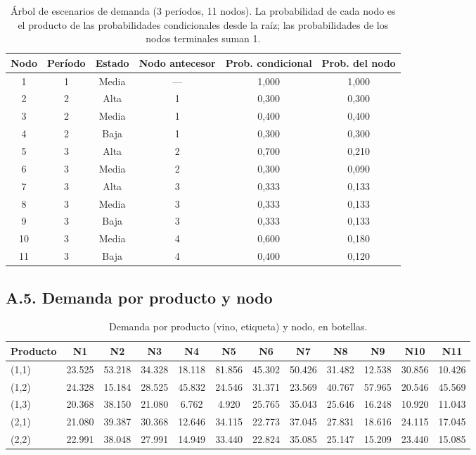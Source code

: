 \begin{table}[h]
  \centering
  \begin{tabular}{cccccc}
    \toprule
    \textbf{Nodo} & \textbf{Período} & \textbf{Estado} & \textbf{Nodo antecesor} & \textbf{Prob. condicional} & \textbf{Prob. del nodo} \\
    \midrule
    1  & 1 & Media & --- & 1,000 & 1,000 \\
    2  & 2 & Alta  & 1   & 0,300 & 0,300 \\
    3  & 2 & Media & 1   & 0,400 & 0,400 \\
    4  & 2 & Baja  & 1   & 0,300 & 0,300 \\
    5  & 3 & Alta  & 2   & 0,700 & 0,210 \\
    6  & 3 & Media & 2   & 0,300 & 0,090 \\
    7  & 3 & Alta  & 3   & 0,333 & 0,133 \\
    8  & 3 & Media & 3   & 0,333 & 0,133 \\
    9  & 3 & Baja  & 3   & 0,333 & 0,133 \\
    10 & 3 & Media & 4   & 0,600 & 0,180 \\
    11 & 3 & Baja  & 4   & 0,400 & 0,120 \\
    \bottomrule
  \end{tabular}
  \caption{Árbol de escenarios de demanda (3 períodos, 11 nodos). La
  probabilidad de cada nodo es el producto de las probabilidades
  condicionales desde la raíz; las probabilidades de los nodos terminales
  suman 1.}
  \label{tab:anexoA-arbol}
\end{table}

\subsection*{A.5. Demanda por producto y nodo}

\begin{table}[h]
  \centering
  \small
  \begin{tabular}{lccccccccccc}
    \toprule
    \textbf{Producto} & N1 & N2 & N3 & N4 & N5 & N6 & N7 & N8 & N9 & N10 & N11 \\
    \midrule
    (1,1) & 23.525 & 53.218 & 34.328 & 18.118 & 81.856 & 45.302 & 50.426 & 31.482 & 12.538 & 30.856 & 10.426 \\
    (1,2) & 24.328 & 15.184 & 28.525 & 45.832 & 24.546 & 31.371 & 23.569 & 40.767 & 57.965 & 20.546 & 45.569 \\
    (1,3) & 20.368 & 38.150 & 21.080 & 6.762  & 4.920  & 25.765 & 35.043 & 25.646 & 16.248 & 10.920 & 11.043 \\
    (2,1) & 21.080 & 39.387 & 30.368 & 12.646 & 34.115 & 22.773 & 37.045 & 27.831 & 18.616 & 24.115 & 17.045 \\
    (2,2) & 22.991 & 38.048 & 27.991 & 14.949 & 33.440 & 22.824 & 35.085 & 25.147 & 15.209 & 23.440 & 15.085 \\
    \bottomrule
  \end{tabular}
  \caption{Demanda por producto (vino, etiqueta) y nodo, en botellas.}
  \label{tab:anexoA-demanda}
\end{table}

